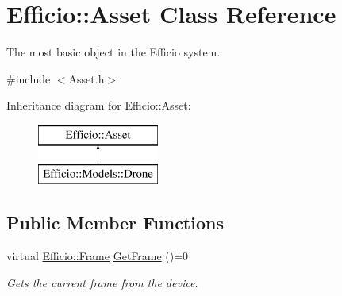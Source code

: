 \hypertarget{class_efficio_1_1_asset}{}\section{Efficio\+:\+:Asset Class Reference}
\label{class_efficio_1_1_asset}


The most basic object in the Efficio system.  




{\ttfamily \#include $<$Asset.\+h$>$}

Inheritance diagram for Efficio\+:\+:Asset\+:\begin{figure}[H]
\begin{center}
\leavevmode
\includegraphics[height=2.000000cm]{class_efficio_1_1_asset}
\end{center}
\end{figure}
\subsection*{Public Member Functions}
\begin{DoxyCompactItemize}
\item 
virtual \hyperlink{class_efficio_1_1_frame}{Efficio\+::\+Frame} \hyperlink{class_efficio_1_1_asset_a1c4a1d09ec78ce303a4c4d0b470b9938}{Get\+Frame} ()=0\hypertarget{class_efficio_1_1_asset_a1c4a1d09ec78ce303a4c4d0b470b9938}{}\label{class_efficio_1_1_asset_a1c4a1d09ec78ce303a4c4d0b470b9938}

\begin{DoxyCompactList}\small\item\em Gets the current frame from the device. \end{DoxyCompactList}\end{DoxyCompactItemize}
